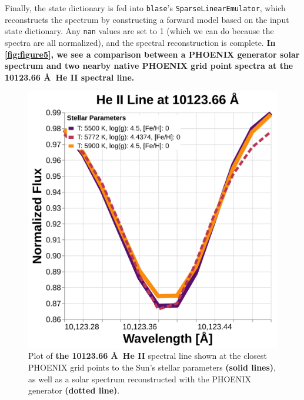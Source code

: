 \documentclass[twocolumn, linenumbers]{aastex631}
\begin{document}
Finally, the state dictionary is fed into \texttt{blase}'s \texttt{SparseLinearEmulator}, which reconstructs the spectrum by constructing a forward model based on the input state dictionary.
Any \texttt{nan} values are set to 1 (which we can do because the spectra are all normalized), and the spectral reconstruction is complete.
\textbf{In \autoref{fig:figure5}, we see a comparison between a PHOENIX generator solar spectrum and two nearby native PHOENIX grid point spectra at the 10123.66 \AA \ He II spectral line.}
\begin{figure}
    \centering
    \includegraphics[width=\columnwidth]{figure5}
    \caption{Plot of \textbf{the 10123.66 \AA \ He II} spectral line shown at the closest PHOENIX grid points to the Sun's stellar parameters \textbf{(solid lines)}, as well as a solar spectrum reconstructed with the PHOENIX generator \textbf{(dotted line)}.}
    \label{fig:figure5}
\end{figure}
\end{document}
